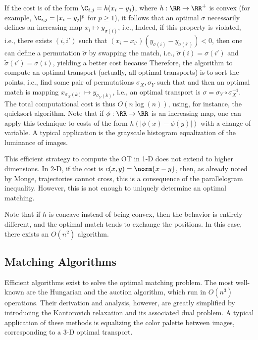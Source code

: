 If the cost is of the form $\C_{i,j}=h(x_i-y_j)$, where $h: \RR \rightarrow \RR^+$ is convex (for example, $\C_{i,j}=|x_i-y_j|^p$ for $p \geq 1$), it follows that an optimal $\sigma$ necessarily defines an increasing map $x_i \mapsto y_{\sigma(i)}$, i.e.,
Indeed, if this property is violated, i.e., there exists $(i,i')$ such that $(x_i-x_{i'})(y_{\sigma(i)}-y_{\sigma(i')}) < 0$, then one can define a permutation $\tilde{\sigma}$ by swapping the match, i.e., $\tilde{\sigma}(i)=\sigma(i')$ and $\tilde{\sigma}(i')=\sigma(i)$, yielding a better cost
because
Therefore, the algorithm to compute an optimal transport (actually, all optimal transports) is to sort the points, i.e., find some pair of permutations $\sigma_X, \sigma_Y$ such that
and then an optimal match is mapping $x_{\sigma_X(k)} \mapsto y_{\sigma_Y(k)}$, i.e., an optimal transport is $\sigma = \sigma_Y \circ \sigma_X^{-1}$. The total computational cost is thus $O(n\log(n))$, using, for instance, the quicksort algorithm.
%
Note that if $\phi : \RR \rightarrow \RR$ is an increasing map, one can apply this technique to costs of the form $h(|\phi(x)-\phi(y)|)$ with a change of variable.
%
A typical application is the grayscale histogram equalization of the luminance of images.

This efficient strategy to compute the OT in 1-D does not extend to higher dimensions. In 2-D, if the cost is $c(x,y) = \norm{x-y}$, then, as already noted by Monge, trajectories cannot cross, this is a consequence of the parallelogram inequality. However, this is not enough to uniquely determine an optimal matching. 

Note that if $h$ is concave instead of being convex, then the behavior is entirely different, and the optimal match tends to exchange the positions. In this case, there exists an $O(n^2)$ algorithm.


\subsection{Matching Algorithms}

Efficient algorithms exist to solve the optimal matching problem. The most well-known are the Hungarian and the auction algorithm, which run in $O(n^3)$ operations. Their derivation and analysis, however, are greatly simplified by introducing the Kantorovich relaxation and its associated dual problem.
%
A typical application of these methods is equalizing the color palette between images, corresponding to a 3-D optimal transport.
